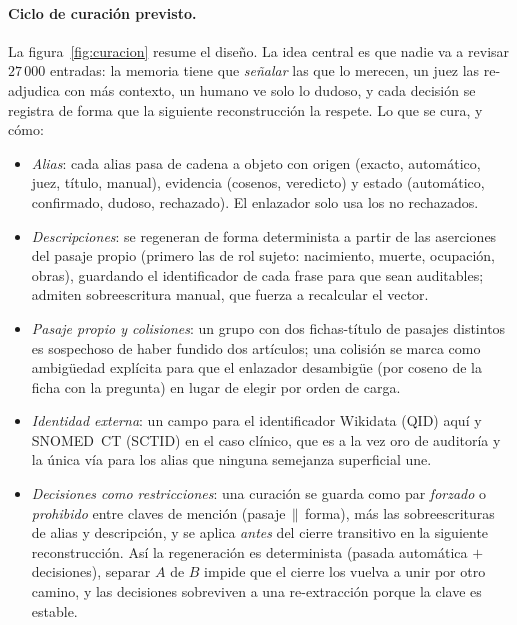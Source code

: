 \documentclass[11pt,a4paper]{article}
\begin{document}
\paragraph{Ciclo de curación previsto.}
La figura~\ref{fig:curacion} resume el diseño. La idea central es que
nadie va a revisar $27\,000$ entradas: la memoria tiene que \emph{señalar}
las que lo merecen, un juez las re-adjudica con más contexto, un humano
ve solo lo dudoso, y cada decisión se registra de forma que la siguiente
reconstrucción la respete. Lo que se cura, y cómo:
\begin{itemize}[leftmargin=1.4em, itemsep=1pt]
\item \emph{Alias}: cada alias pasa de cadena a objeto con origen (exacto,
  automático, juez, título, manual), evidencia (cosenos, veredicto) y
  estado (automático, confirmado, dudoso, rechazado). El enlazador solo usa
  los no rechazados.
\item \emph{Descripciones}: se regeneran de forma determinista a partir de
  las aserciones del pasaje propio (primero las de rol sujeto: nacimiento,
  muerte, ocupación, obras), guardando el identificador de cada frase para
  que sean auditables; admiten sobreescritura manual, que fuerza a
  recalcular el vector.
\item \emph{Pasaje propio y colisiones}: un grupo con dos fichas-título de
  pasajes distintos es sospechoso de haber fundido dos artículos; una
  colisión se marca como ambigüedad explícita para que el enlazador
  desambigüe (por coseno de la ficha con la pregunta) en lugar de elegir
  por orden de carga.
\item \emph{Identidad externa}: un campo para el identificador Wikidata
  (QID) aquí y SNOMED~CT (SCTID) en el caso clínico, que es a la vez oro
  de auditoría y la única vía para los alias que ninguna semejanza
  superficial une.
\item \emph{Decisiones como restricciones}: una curación se guarda como
  par \emph{forzado} o \emph{prohibido} entre claves de mención
  (pasaje$\,\|\,$forma), más las sobreescrituras de alias y descripción, y
  se aplica \emph{antes} del cierre transitivo en la siguiente
  reconstrucción. Así la regeneración es determinista (pasada automática
  $+$ decisiones), \guillemotleft{}separar $A$ de $B$\guillemotright{} impide que el cierre los vuelva a
  unir por otro camino, y las decisiones sobreviven a una re-extracción
  porque la clave es estable.
\end{itemize}
\end{document}
